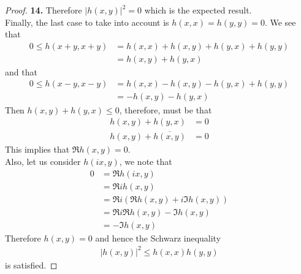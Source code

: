 \documentclass[11pt]{article}
\theoremstyle{definition}
\begin{document}
\begin{proof}{\textbf{14.}}
Therefore $|h(x,y)|^2 = 0$ which is the expected result. \\
Finally, the last case to take into account is $h(x,x) = h(y,y) = 0$.
We see that
\begin{align*}
    0 \leq h(x + y, x + y) &= h(x,x) + h(x, y) + h(y, x) + h(y, y) \\
    &=  h(x, y) + h(y, x)
\end{align*}
and that
\begin{align*}
    0 \leq h(x - y, x - y) &= h(x,x) - h(x,y) - h(y, x) + h(y,y)\\
    &=  -h(x, y) - h(y, x)
\end{align*}
Then $h(x, y) + h(y, x) \leq 0$, therefore, must be that
\begin{align*}
    h(x, y) + h(y, x) &= 0 \\
    h(x, y) + \overline{h(x, y)}&= 0
\end{align*}
This implies that $\Re{h(x,y)} = 0$.\\
Also, let us consider $h(ix,y)$, we note that 
\begin{align*}
    0 &= \Re{h(ix, y)} \\
    &= \Re{ih(x, y)} \\
    &= \Re{i(\Re{h(x, y)} + i\Im{h(x,y)})} \\
    &= \Re{i\Re{h(x, y)} - \Im{h(x,y)}} \\
    &= -\Im{h(x,y)}
\end{align*}
Therefore $h(x,y) = 0$ and hence the Schwarz inequality
\begin{align*}
    |h(x,y)|^2 \leq h(x,x) h(y,y)
\end{align*}
is satisfied.
\end{proof}
\end{document}
